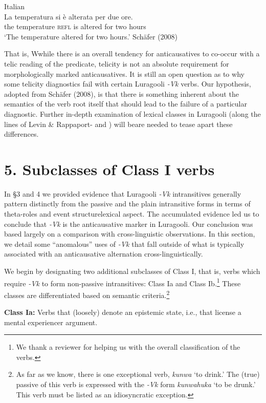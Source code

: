 \documentclass[output=paper]{langsci/langscibook}
\begin{document}
\ea
{Italian}\\
\gll La temperatura  si     è   alterata per  due ore.\\
     the temperature \textsc{refl} is  altered  for   two hours\\
\glt ‘The temperature altered for two hours.’        Schäfer (2008)
\z

That is, Wwhile there is an overall tendency for anticausatives to co-occur with a telic reading of the predicate, telicity is not an absolute requirement for morphologically marked anticausatives. It is still an open question as to why some telicity diagnostics fail with certain Luragooli \textit{{}-Vk} verbs. Our hypothesis, adopted from Schäfer (2008), is that there is something inherent about the semantics of the verb root itself that should lead to the failure of a particular diagnostic. Further in-depth examination of lexical classes in Luragooli (along the lines of Levin \& Rappaport-\citet{Hovav1995} and \citet{Haspelmath2005}) will beare needed to tease apart these differences. 

\chapter{5. Subclasses of Class I verbs}

In §3 and 4 we provided evidence that Luragooli \textit{{}-Vk} intransitives generally pattern distinctly from the passive and the plain intransitive forms in terms of theta-roles and event structurelexical aspect. The accumulated evidence led us to conclude that \textit{{}-Vk} is the anticausative marker in Luragooli. Our conclusion was based largely on a comparison with cross-linguistic observations. In this section, we detail some “anomalous” uses of \textit{{}-Vk} that fall outside of what is typically associated with an anticausative alternation cross-linguistically.

We begin by designating two additional subclasses of Class I, that is, verbs which require \textit{{}-Vk} to form non-passive intransitives: Class Ia and Class Ib.\footnote{We thank a reviewer for helping us with the overall classification of the verbs.} These classes are differentiated based on semantic criteria.\footnote{ As far as we know, there is one exceptional verb, \textit{kunwa} ‘to drink.’ The (true) passive of this verb is expressed with the \textit{{}-Vk }form \textit{kunwahuka }‘to be drunk.’ This verb must be listed as an idiosyncratic exception. }

\textbf{Class Ia:} Verbs that (loosely) denote an epistemic state, i.e., that license a mental experiencer argument.
\end{document}

